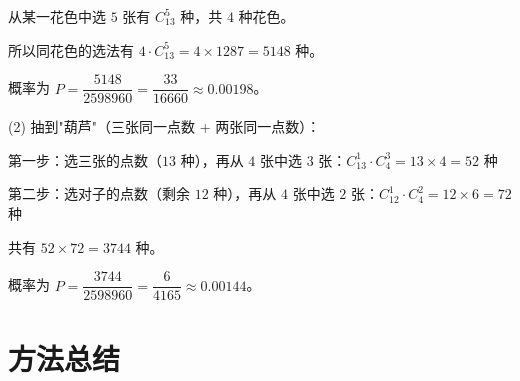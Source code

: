 \documentclass[11pt]{ctexrep}
\begin{document}
从某一花色中选 $5$ 张有 $C_{13}^5$ 种，共 $4$ 种花色。

所以同花色的选法有 $4 \cdot C_{13}^5 = 4 \times 1287 = 5148$ 种。

概率为 $P = \dfrac{5148}{2598960} = \dfrac{33}{16660} \approx 0.00198$。

(2) 抽到"葫芦"（三张同一点数 + 两张同一点数）：

第一步：选三张的点数（$13$ 种），再从 $4$ 张中选 $3$ 张：$C_{13}^1 \cdot C_4^3 = 13 \times 4 = 52$ 种

第二步：选对子的点数（剩余 $12$ 种），再从 $4$ 张中选 $2$ 张：$C_{12}^1 \cdot C_4^2 = 12 \times 6 = 72$ 种

共有 $52 \times 72 = 3744$ 种。

概率为 $P = \dfrac{3744}{2598960} = \dfrac{6}{4165} \approx 0.00144$。

\section*{方法总结}
\end{document}
